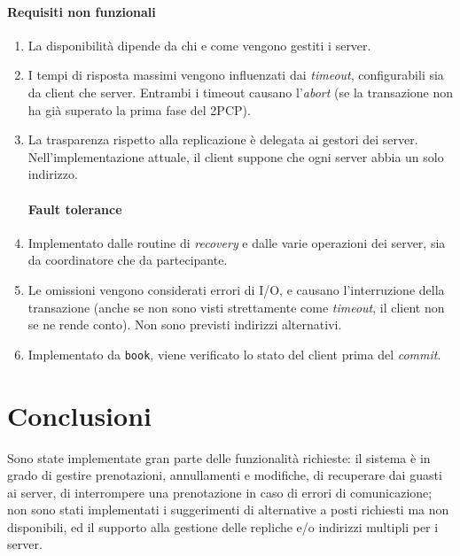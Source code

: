 \documentclass[a4paper]{article}
\begin{document}
\paragraph{Requisiti non funzionali}
\begin{enumerate}
	\item La disponibilità dipende da chi  e come vengono gestiti i server.
	\item I tempi di risposta massimi vengono influenzati dai \textit{timeout}, configurabili sia da client che server. Entrambi i timeout causano l'\textit{abort} (se la transazione non ha già superato la prima fase del 2PCP).
	\item La trasparenza rispetto alla replicazione è delegata ai gestori dei server. Nell'implementazione attuale, il client suppone che ogni server abbia un solo indirizzo.
	\paragraph{Fault tolerance}
	\item Implementato dalle routine di \textit{recovery} e dalle varie operazioni dei server, sia da coordinatore che da partecipante.
	\item Le omissioni vengono considerati errori di I/O, e causano l'interruzione della transazione (anche se non sono visti strettamente come \textit{timeout}, il client non se ne rende conto). Non sono previsti indirizzi alternativi.
	\item Implementato da \texttt{book}, viene verificato lo stato del client prima del \textit{commit}.
\end{enumerate}



\section{Conclusioni}

Sono state implementate gran parte delle funzionalità richieste: il sistema è in grado di gestire prenotazioni, annullamenti e modifiche, di recuperare dai guasti ai server, di interrompere una prenotazione in caso di errori di comunicazione; non sono stati implementati i suggerimenti di alternative a posti richiesti ma non disponibili, ed il supporto alla gestione delle repliche e/o indirizzi multipli per i server.
\end{document}
